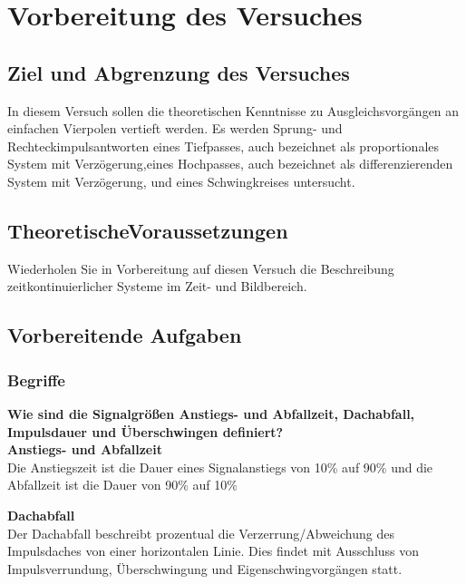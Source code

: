 \section{Vorbereitung des Versuches}

\subsection{Ziel und Abgrenzung des Versuches}

In diesem Versuch sollen die theoretischen Kenntnisse zu Ausgleichsvorgängen an 
einfachen Vierpolen vertieft werden. Es werden Sprung- und Rechteckimpulsantworten eines 
Tiefpasses, auch bezeichnet als proportionales System mit Verzögerung,eines Hochpasses, 
auch bezeichnet als differenzierenden System mit Verzögerung, und eines Schwingkreises untersucht.\\
\newline

\subsection{TheoretischeVoraussetzungen}

Wiederholen Sie in Vorbereitung auf diesen Versuch die Beschreibung 
zeitkontinuierlicher Systeme im Zeit- und Bildbereich.
\newline


\subsection{Vorbereitende Aufgaben}

\subsubsection{Begriffe}

\textbf{Wie sind die Signalgrößen Anstiegs- und Abfallzeit, Dachabfall, Impulsdauer und Überschwingen definiert?}\\

\textbf{Anstiegs- und Abfallzeit}\\
Die Anstiegszeit ist die Dauer eines Signalanstiegs von 10\% auf 90\% und die Abfallzeit ist die 
Dauer von 90\% auf 10\%

\textbf{Dachabfall}\\
Der Dachabfall beschreibt prozentual die Verzerrung/Abweichung des Impulsdaches von einer horizontalen 
Linie. Dies findet mit Ausschluss von Impulsverrundung, Überschwingung und Eigenschwingvorgängen statt.

